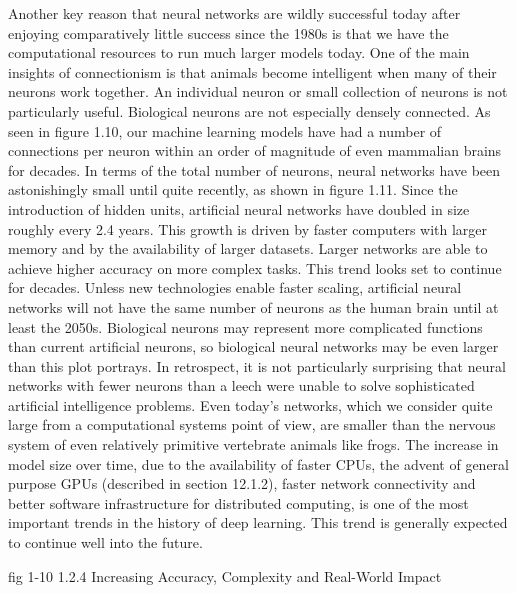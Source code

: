 \documentclass[11pt]{article}
\begin{document}
Another key reason that neural networks are wildly successful today after enjoying comparatively little success since the 1980s is that we have the computational resources to run much larger models today.
One of the main insights of connectionism is that animals become intelligent when many of their neurons work together.
An individual neuron or small collection of neurons is not particularly useful.
Biological neurons are not especially densely connected.
As seen in figure 1.10, our machine learning models have had a number of connections per neuron within an order of magnitude of even mammalian brains for decades.
In terms of the total number of neurons, neural networks have been astonishingly small until quite recently, as shown in figure 1.11.
Since the introduction of hidden units, artificial neural networks have doubled in size roughly every 2.4 years.
This growth is driven by faster computers with larger memory and by the availability of larger datasets.
Larger networks are able to achieve higher accuracy on more complex tasks.
This trend looks set to continue for decades.
Unless new technologies enable faster scaling, artificial neural networks will not have the same number
of neurons as the human brain until at least the 2050s.
Biological neurons may represent more complicated functions than current artificial neurons, so biological neural networks may be even larger than this plot portrays.
In retrospect, it is not particularly surprising that neural networks with fewer neurons than a leech were unable to solve sophisticated artificial intelligence problems.
Even today’s networks, which we consider quite large from a computational systems point of view, are smaller than the nervous system of even relatively primitive vertebrate animals like frogs.
The increase in model size over time, due to the availability of faster CPUs, the advent of general purpose GPUs (described in section 12.1.2), faster network connectivity and better software infrastructure for distributed computing, is one of the most important trends in the history of deep learning.
This trend is generally expected to continue well into the future.

fig 1-10
1.2.4 Increasing Accuracy, Complexity and Real-World Impact
\end{document}
